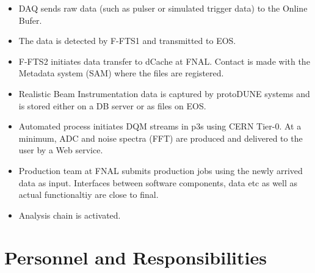 \documentclass[pdftex,12pt,letter]{article}
\newcommand{\pd}{protoDUNE\xspace}
\begin{document}
\begin{itemize}

\item DAQ sends raw data (such as pulser or simulated trigger data) to the Online Bufer.

\item The data is detected by F-FTS1 and transmitted to EOS.

\item F-FTS2 initiates data transfer to dCache at FNAL. Contact is made with the Metadata system (SAM) where the files
are registered.

\item Realistic Beam Instrumentation data is captured by \pd systems and is stored either on a DB server or as files on EOS.

\item Automated process initiates DQM streams in p3s using  CERN Tier-0. At a minimum, ADC and noise spectra (FFT) are produced
and delivered to the user by a Web service.

\item Production team at FNAL submits production jobs using the newly arrived data as input. Interfaces between software components,
data etc as well as actual functionaltiy are close to final.

\item Analysis chain is activated.

\end{itemize}


\section{Personnel and Responsibilities}
\end{document}
